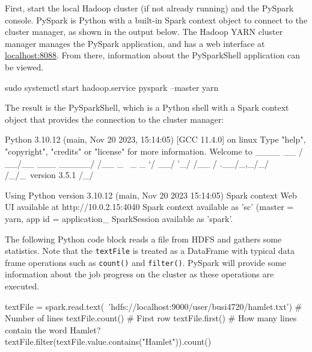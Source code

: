 First, start the local Hadoop cluster (if not already running) and the PySpark console. PySpark is Python with a built-in Spark context object to connect to the cluster manager, as shown in the output below. The Hadoop YARN cluster manager manages the PySpark application, and has a web interface at \url{localhost:8088}. From there, information about the PySparkShell application can be viewed.

\begin{samepage}
\begin{bashcode}
sudo systemctl start hadoop.service
pyspark --master yarn
\end{bashcode}
\end{samepage}

The result is the PySparkShell, which is a Python shell with a Spark context object that provides the connection to the cluster manager:

\begin{samepage}
\begin{textcode}
Python 3.10.12 (main, Nov 20 2023, 15:14:05) [GCC 11.4.0] on linux
Type "help", "copyright", "credits" or "license" for more information.
Welcome to
      ____              __
     / __/__  ___ _____/ /__
    _\ \/ _ \/ _ `/ __/  '_/
   /__ / .__/\_,_/_/ /_/\_\   version 3.5.1
      /_/

Using Python version 3.10.12 (main, Nov 20 2023 15:14:05)
Spark context Web UI available at http://10.0.2.15:4040
Spark context available as 'sc' (master = yarn, app id = application_
SparkSession available as 'spark'.
\end{textcode}
\end{samepage}

The following Python code block reads a file from HDFS and gathers some statistics. Note that the \texttt{textFile} is treated as a DataFrame with typical data frame operations such as \texttt{count()} and \texttt{filter()}. PySpark will provide some information about the job progress on the cluster as these operations are executed.

\begin{samepage}
\begin{pythoncode}
textFile = spark.read.text(\
    'hdfs://localhost:9000/user/busi4720/hamlet.txt')
# Number of lines
textFile.count() 
# First row
textFile.first()
# How many lines contain the word Hamlet?
textFile.filter(textFile.value.contains("Hamlet")).count() 
\end{pythoncode}
\end{samepage}

